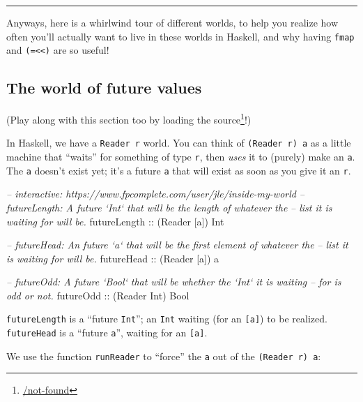 \documentclass[]{article}
\newenvironment{Shaded}{}{}
\newcommand{\DataTypeTok}[1]{\textcolor[rgb]{0.56,0.13,0.00}{{#1}}}
\newcommand{\CommentTok}[1]{\textcolor[rgb]{0.38,0.63,0.69}{\textit{{#1}}}}
\newcommand{\OtherTok}[1]{\textcolor[rgb]{0.00,0.44,0.13}{{#1}}}
\newcommand{\NormalTok}[1]{{#1}}
\renewcommand{\href}[2]{#2\footnote{\url{#1}}}
\begin{document}
\begin{center}\rule{0.5\linewidth}{\linethickness}\end{center}

Anyways, here is a whirlwind tour of different worlds, to help you
realize how often you'll actually want to live in these worlds in
Haskell, and why having \texttt{fmap} and
\texttt{(=\textless{}\textless{})} are so useful!

\subsection{The world of future
values}\label{the-world-of-future-values}

(Play along with this section too by \href{/not-found}{loading the
source}!)

In Haskell, we have a \texttt{Reader\ r} world. You can think of
\texttt{(Reader\ r)\ a} as a little machine that ``waits'' for something
of type \texttt{r}, then \emph{uses} it to (purely) make an \texttt{a}.
The \texttt{a} doesn't exist yet; it's a future \texttt{a} that will
exist as soon as you give it an \texttt{r}.

\begin{Shaded}
\begin{Highlighting}[]
\CommentTok{-- interactive: https://www.fpcomplete.com/user/jle/inside-my-world}
\CommentTok{-- futureLength: A future `Int` that will be the length of whatever the}
\CommentTok{--      list it is waiting for will be.}
\OtherTok{futureLength ::} \NormalTok{(}\DataTypeTok{Reader} \NormalTok{[a]) }\DataTypeTok{Int}

\CommentTok{-- futureHead: An future `a` that will be the first element of whatever the}
\CommentTok{--      list it is waiting for will be.}
\OtherTok{futureHead   ::} \NormalTok{(}\DataTypeTok{Reader} \NormalTok{[a]) a}

\CommentTok{-- futureOdd: A future `Bool` that will be whether the `Int` it is waiting}
\CommentTok{--      for is odd or not.}
\OtherTok{futureOdd    ::} \NormalTok{(}\DataTypeTok{Reader} \DataTypeTok{Int}\NormalTok{) }\DataTypeTok{Bool}
\end{Highlighting}
\end{Shaded}

\texttt{futureLength} is a ``future \texttt{Int}''; an \texttt{Int}
waiting (for an \texttt{{[}a{]}}) to be realized. \texttt{futureHead} is
a ``future \texttt{a}'', waiting for an \texttt{{[}a{]}}.

We use the function \texttt{runReader} to ``force'' the \texttt{a} out
of the \texttt{(Reader\ r)\ a}:
\end{document}
